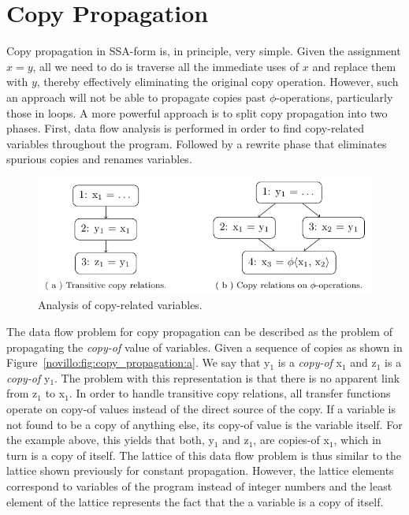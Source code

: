\section{Copy Propagation}
\label{novillo:sec:copy-prop}

Copy propagation in SSA-form is, in principle, very simple.  Given the
assignment \linebreak $x = y$, all we need to do is traverse all the immediate
uses of $x$ and replace them with $y$, thereby effectively eliminating the
original copy operation. However, such an approach will not be able to propagate
copies past $\phi$-operations, particularly those in loops. A more powerful
approach is to split copy propagation into two phases. First, data flow analysis
is performed in order to find copy-related variables throughout the program.
Followed by a rewrite phase that eliminates spurious copies and renames
variables.

\begin{figure}[b!]
  \begin{center}
    \includegraphics{copy_propagation}
    \subfigure{\label{novillo:fig:copy_propagation:a}}
    \subfigure{\label{novillo:fig:copy_propagation:b}}
  \end{center}
  \vspace{-1em}
  \caption{Analysis of copy-related variables.}
  \label{novillo:fig:copy_propagation}
\end{figure}

The data flow problem for copy propagation can be described as the problem of
propagating the \textit{copy-of} value of variables.  Given a sequence of
copies as shown in Figure~\ref{novillo:fig:copy_propagation:a}. We say that
y$_1$ is a \textit{copy-of} x$_1$ and z$_1$ is a \textit{copy-of} y$_1$.  The
problem with this representation is that there is no apparent link from z$_1$ to
x$_1$.  In order to handle transitive copy relations, all transfer functions
operate on copy-of values instead of the direct source of the copy.  If a
variable is not found to be a copy of anything else, its copy-of value is the
variable itself. For the example above, this yields that both, y$_1$ and z$_1$,
are copies-of x$_1$, which in turn is a copy of itself. The lattice of this data
flow problem is thus similar to the lattice shown previously for constant
propagation. However, the lattice elements correspond to variables of the
program instead of integer numbers and the least element of the lattice
represents the fact that the a variable is a copy of itself.

